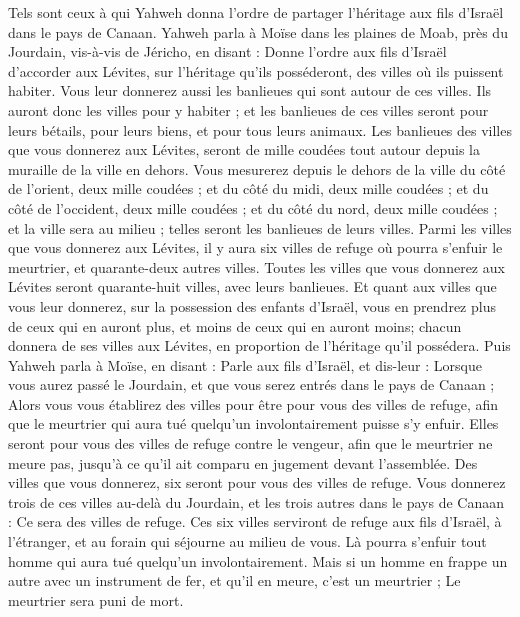 \begin{multicols}{2}
Tels sont ceux à qui Yahweh donna l’ordre de partager l'héritage aux fils d'Israël dans le pays de Canaan.
\VerseOne{}Yahweh parla à Moïse dans les plaines de Moab, près du Jourdain, vis-à-vis de Jéricho, en disant :
Donne l’ordre aux fils d'Israël d’accorder aux Lévites, sur l’héritage qu’ils posséderont, des villes où ils puissent habiter. Vous leur donnerez aussi les banlieues qui sont autour de ces villes.
Ils auront donc les villes pour y habiter ; et les banlieues de ces villes seront pour leurs bétails, pour leurs biens, et pour tous leurs animaux.
Les banlieues des villes que vous donnerez aux Lévites, seront de mille coudées tout autour depuis la muraille de la ville en dehors.
Vous mesurerez depuis le dehors de la ville du côté de l'orient, deux mille coudées ; et du côté du midi, deux mille coudées ; et du côté de l'occident, deux mille coudées ; et du côté du nord, deux mille coudées ; et la ville sera au milieu ; telles seront les banlieues de leurs villes.
Parmi les villes que vous donnerez aux Lévites, il y aura six villes de refuge où pourra s’enfuir le meurtrier, et quarante-deux autres villes.
Toutes les villes que vous donnerez aux Lévites seront quarante-huit villes, avec leurs banlieues.
Et quant aux villes que vous leur donnerez, sur la possession des enfants d'Israël, vous en prendrez plus de ceux qui en auront plus, et moins de ceux qui en auront moins; chacun donnera de ses villes aux Lévites, en proportion de l'héritage qu'il possédera.
Puis Yahweh parla à Moïse, en disant :
Parle aux fils d'Israël, et dis-leur : Lorsque vous aurez passé le Jourdain, et que vous serez entrés dans le pays de Canaan ;
Alors vous vous établirez des villes pour être pour vous des villes de refuge, afin que le meurtrier qui aura tué quelqu’un involontairement puisse s’y enfuir.
Elles seront pour vous des villes de refuge contre le vengeur, afin que le meurtrier ne meure pas, jusqu’à ce qu’il ait comparu en jugement devant l’assemblée.
Des villes que vous donnerez, six seront pour vous des villes de refuge.
Vous donnerez trois de ces villes au-delà du Jourdain, et les trois autres dans le pays de Canaan : Ce sera des villes de refuge.
Ces six villes serviront de refuge aux fils d'Israël, à l'étranger, et au forain qui séjourne au milieu de vous. Là pourra s’enfuir tout homme qui aura tué quelqu’un involontairement.
Mais si un homme en frappe un autre avec un instrument de fer, et qu'il en meure, c’est un meurtrier ; Le meurtrier sera puni de mort.

\end{multicols}
